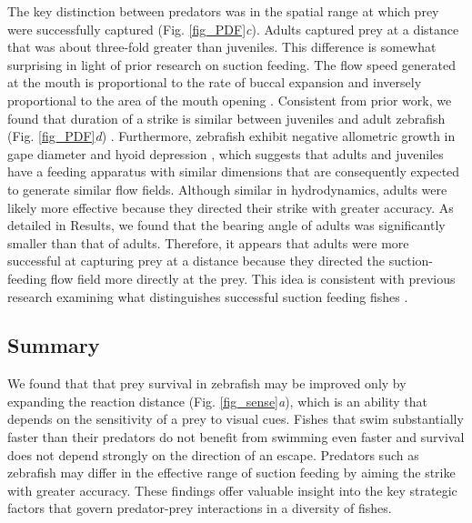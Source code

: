 \documentclass[]{rsos}%
\begin{document}
The key distinction between predators was in the spatial range at which prey were successfully captured (Fig. \ref{fig_PDF}\textit{c}).
Adults captured prey at a distance that was about three-fold greater than juveniles.
This difference is somewhat surprising in light of prior research on suction feeding. 
The flow speed generated at the mouth is proportional to the rate of buccal expansion and inversely proportional to the area of the mouth opening \cite{Holzman:2008jc,Muller:1982p335}.
Consistent from prior work, we found that duration of a strike is similar between juveniles and adult zebrafish (Fig. \ref{fig_PDF}\textit{d}) \cite{Hernandez:2000uma}.
Furthermore, zebrafish exhibit negative allometric growth in gape diameter and hyoid depression \cite{Hernandez:2000uma}, which suggests that adults and juveniles have a feeding apparatus with similar dimensions that are consequently expected to generate similar flow fields.
Although similar in hydrodynamics, adults were likely more effective because they directed their strike with greater accuracy. 
As detailed in Results, we found that the bearing angle of adults was significantly smaller than that of adults. 
Therefore, it appears that adults were more successful at capturing prey at a distance because they directed the suction-feeding flow field more directly at the prey.
This idea is consistent with previous research examining what distinguishes successful suction feeding fishes \cite{Kane:2014bh}.


\subsection*{Summary} 

We found that that prey survival in zebrafish may be improved only by expanding the reaction distance (Fig. \ref{fig_sense}\textit{a}), which is an ability that depends on the sensitivity of a prey to visual cues. 
Fishes that swim substantially faster than their predators do not benefit from swimming even faster and survival does not depend strongly on the direction of an escape.
Predators such as zebrafish may differ in the effective range of suction feeding by aiming the strike with greater accuracy.
These findings offer valuable insight into the key strategic factors that govern predator-prey interactions in a diversity of fishes. 


\end{document}
